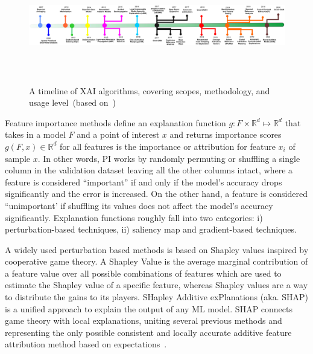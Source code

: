 \begin{figure}
	\centering
	\includegraphics[width=\textwidth,height=50mm]{images/xai_roadmap.png}	
    \caption{A timeline of XAI algorithms, covering scopes, methodology, and usage level~(based on~\cite{das2020opportunities})}	
	\label{fig:xai_timeline}
\end{figure}

\hspace*{3.5mm} Feature importance methods define an explanation function $g: F \times \mathbb{R}^{d} \mapsto \mathbb{R}^{d}$ that takes in a model $F$ and a point of interest $x$ and returns importance scores $g(F,x) \in \mathbb{R}^{d}$ for all features is the importance or attribution for feature $x_i$ of sample $x$. In other words, PI works by randomly permuting or shuffling a single column in the validation dataset leaving all the other columns intact, where a feature is considered ``important” if and only if the model's accuracy drops significantly and the error is increased. On the other hand, a feature is considered ``unimportant’ if shuffling its values does not affect the model's accuracy significantly. Explanation functions roughly fall into two categories: i) perturbation-based techniques, ii) saliency map and gradient-based techniques. 

\hspace*{3.5mm} A widely used perturbation based methods is based on Shapley values inspired by cooperative game theory. A Shapley Value is the average marginal contribution of a feature value over all possible combinations of features which are used to estimate the Shapley value of a specific feature, whereas Shapley values are a way to distribute the gains to its players. SHapley Additive exPlanations (aka. SHAP) is a unified approach to explain the output of any ML model. SHAP connects game theory with local explanations, uniting several previous methods and representing the only possible consistent and locally accurate additive feature attribution method based on expectations~\cite{NIPS2017_7062}. 

